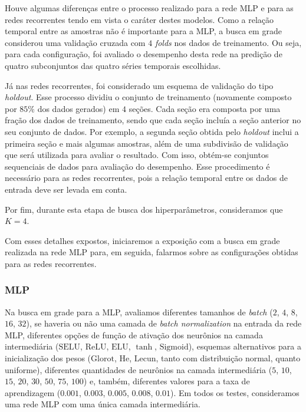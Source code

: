 \documentclass[a4paper, 12pt]{article}
\newcommand{\sigmoid}{\text{Sigmoid}}
\newcommand{\selu}{\text{SELU}}
\newcommand{\relu}{\text{ReLU}}
\newcommand{\elu}{\text{ELU}}
\newcommand{\lecun}{\text{Lecun}}
\newcommand{\he}{\text{He}}
\newcommand{\glorot}{\text{Glorot}}
\begin{document}
Houve algumas diferenças entre o processo realizado para a rede MLP e para as redes recorrentes tendo em vista o caráter destes modelos. Como a relação temporal entre as amostras não é importante para a MLP, a busca em grade considerou uma validação cruzada com $4$ \textit{folds} nos dados de treinamento. Ou seja, para cada configuração, foi avaliado o desempenho desta rede na predição de quatro subconjuntos das quatro séries temporais escolhidas.

Já nas redes recorrentes, foi considerado um esquema de validação do tipo \textit{holdout}. Esse processo dividiu o conjunto de treinamento (novamente composto por $85\%$ dos dados gerados) em $4$ seções. Cada seção era composta por uma fração dos dados de treinamento, sendo que cada seção incluía a seção anterior no seu conjunto de dados. Por exemplo, a segunda seção obtida pelo \textit{holdout} inclui a primeira seção e mais algumas amostras, além de uma subdivisão de validação que será utilizada para avaliar o resultado. Com isso, obtém-se conjuntos sequenciais de dados para avaliação do desempenho. Esse procedimento é necessário para as redes recorrentes, pois a relação temporal entre os dados de entrada deve ser levada em conta.

Por fim, durante esta etapa de busca dos hiperparâmetros, consideramos que  $K = 4$. 

Com esses detalhes expostos, iniciaremos a exposição com a busca em grade realizada na rede MLP para, em seguida, falarmos sobre as configurações obtidas para as redes recorrentes.

\subsubsection{MLP}

Na busca em grade para a MLP, avaliamos diferentes tamanhos de \textit{batch} ($2$, $4$, $8$, $16$, $32$), se haveria ou não uma camada de \textit{batch normalization} na entrada da rede MLP, diferentes opções de função de ativação dos neurônios na camada intermediária ($\selu$, $\relu$, $\elu$, $\tanh$, $\sigmoid$), esquemas alternativos para a inicialização dos pesos ($\glorot$, $\he$, $\lecun$, tanto com distribuição normal, quanto uniforme), diferentes quantidades de neurônios na camada intermediária ($5$, $10$, $15$, $20$, $30$, $50$, $75$, $100$) e, também, diferentes valores para a taxa de aprendizagem ($0.001$, $0.003$, $0.005$, $0.008$, $0.01$). Em todos os testes, consideramos uma rede MLP com uma única camada intermediária. 
\end{document}

